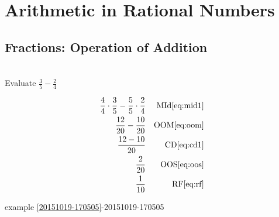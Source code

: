 \documentclass[20150903-160354-rs2.2-MarksMathNotebook.tex]{subfiles}
\begin{document}
%
%

\chapter{Arithmetic in Rational Numbers}



\section{Fractions: Operation of Addition}

\begin{example}[id:20151019-171424] \label{20151019-171424} \hfill \\

Evaluate $ \frac{3}{5}-\frac{2}{4}$

\soln

\solnsteps
\begin{align*}
\frac{4}{4} \cdot \frac{3}{5} - \frac{5}{5} \cdot \frac{2}{4} && \text{MId} \eqref{eq:mid1} \\
\frac{12}{20} - \frac{10}{20} && \text{OOM} \eqref{eq:oom} \\
\frac{12-10}{20} && \text{CD} \eqref{eq:cd1} \\
\frac{2}{20} && \text{OOS} \eqref{eq:oos} \\
\frac{1}{10} && \text{RF} \eqref{eq:rf} 
\end{align*}

\qdepend

\qdependlist
example \ref{20151019-170505}-20151019-170505

\end{example}
\end{document}
